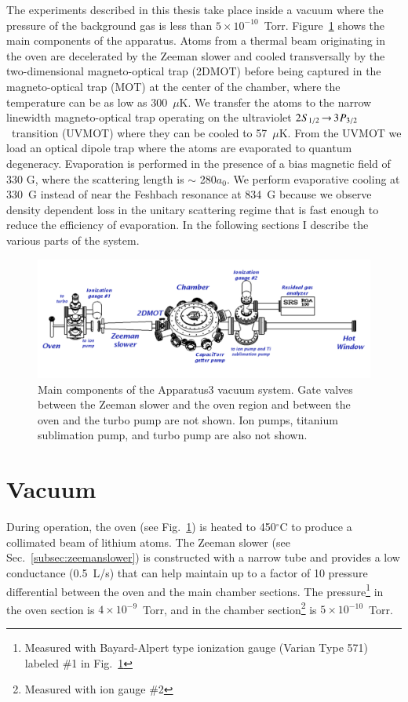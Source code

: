 \documentclass[oneside,12pt]{memoir}
\newcommand{\twos}[1]{\ensuremath{\hspace{-1pt}2\hspace{0.5pt}\hspace{0pt}S_{#1}\hspace{-1pt}}}
\newcommand{\trep}[1]{\ensuremath{\hspace{-1pt}3\hspace{0.5pt}\hspace{0pt}P_{#1}\hspace{-1pt}}}
\newcommand{\uv}{\ensuremath{ \twos{1/2}\hspace{-0.0pt}\rightarrow\hspace{-0.0pt}\trep{3/2} }\ }
\begin{document}
The experiments described in this thesis take place inside a vacuum where the
pressure of the background gas is less than $5\times10^{-10}$~Torr.
Figure~\ref{fig:vacuum} shows the main components of the apparatus.   Atoms
from a thermal beam originating in the oven are decelerated by the Zeeman
slower and cooled transversally by the two-dimensional magneto-optical trap
(2DMOT)  before being captured in the magneto-optical trap (MOT) at the center
of the chamber, where the temperature can be as low as 300~$\mu$K.  We transfer
the atoms to the narrow linewidth magneto-optical trap operating on the
ultraviolet \uv transition (UVMOT) where they can be cooled to 57~$\mu$K.  From
the UVMOT we load an optical dipole trap where the atoms are evaporated to
quantum degeneracy.  Evaporation is performed in the presence of a bias
magnetic field of 330 G, where the scattering length is $\sim$ 280$a_{0}$.  We
perform evaporative cooling at 330~G instead of near the Feshbach resonance at
834~G because we observe density dependent loss in the unitary scattering
regime that is fast enough to reduce the efficiency of evaporation.  In the
following sections I describe the various parts of the system.  
\begin{figure}
\centering \includegraphics[width=\textwidth]{../figures/vacuum/vacuum02.pdf}
\caption[Apparatus3 vacuum system]{\small Main components of the Apparatus3
vacuum system.  Gate valves between the Zeeman slower and the oven region and
between the oven and the turbo pump are not shown. Ion pumps, titanium
sublimation pump, and turbo pump are also not shown.  } \label{fig:vacuum}
\end{figure}

\section{Vacuum}

During operation, the oven (see Fig.~\ref{fig:vacuum}) is heated to
450$^{\circ}$C to produce a collimated beam of lithium atoms.  The Zeeman
slower (see Sec.~\ref{subsec:zeemanslower}) is constructed with a narrow tube
and provides a low conductance (0.5~L/s) that can help maintain up to a factor
of 10 pressure differential between the oven and the main chamber sections.
The pressure\footnote{Measured with Bayard-Alpert type ionization gauge (Varian
Type 571) labeled \#1 in Fig.~\ref{fig:vacuum}} in the oven section is $4\times
10^{-9}$~Torr, and in the chamber section\footnote{Measured with ion gauge \#2}
is $5\times10^{-10}$~Torr.   
\end{document}
